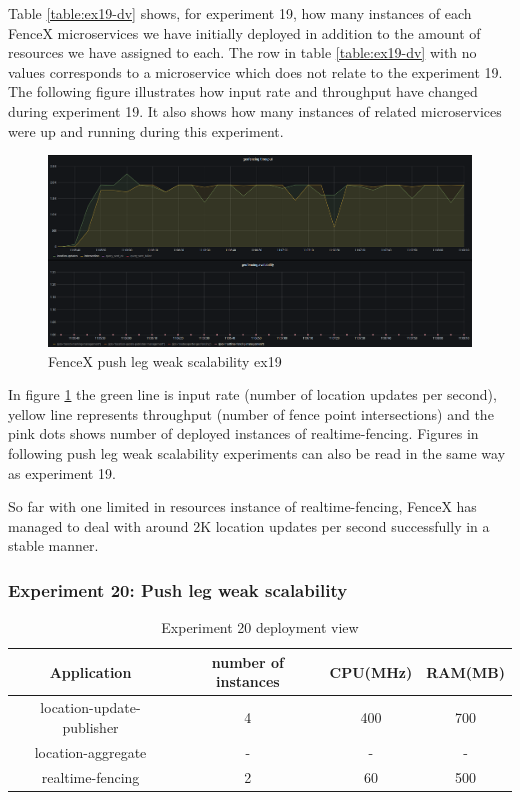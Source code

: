 \documentclass[a4]{report}
\begin{document}
    Table \ref{table:ex19-dv} shows, for experiment 19, how many instances of each FenceX microservices we have
    initially deployed in addition to the amount of resources we have assigned to each.
    The row in table \ref{table:ex19-dv} with no values corresponds to a microservice which does not relate to the
    experiment 19.
    The following figure illustrates how input rate and throughput have changed during experiment 19.
    It also shows how many instances of related microservices were up and running during this experiment.

    \begin{figure}
        \caption{FenceX push leg weak scalability ex19}
        \label{fig:ex19}
        \includegraphics[scale=0.5]{images/evaluation/ex19-benchmarking-ongoing-1per16sec.png}
    \end{figure}

    \clearpage

    In figure \ref{fig:ex19} the green line is input rate (number of location updates per second),
    yellow line represents throughput (number of fence point intersections) and the pink dots shows number of
    deployed instances of realtime-fencing.
    Figures in following push leg weak scalability experiments can also be read in the same way as experiment 19.

    So far with one limited in resources instance of realtime-fencing, FenceX has managed to deal with around 2K
    location updates per second successfully in a stable manner.

    \subsubsection{Experiment 20: Push leg weak scalability}
    \begin{table}[h!]
        \centering
        \begin{tabular}{|c|c|c|c|}
            \hline
            Application               & number of instances & CPU(MHz) & RAM(MB) \\
            \hline
            location-update-publisher & 4                   & 400      & 700     \\
            location-aggregate        & -                   & -        & -       \\
            realtime-fencing          & 2                   & 60       & 500     \\
            \hline
        \end{tabular}
        \caption{Experiment 20 deployment view}
        \label{table:ex20-dv}
    \end{table}
\end{document}
